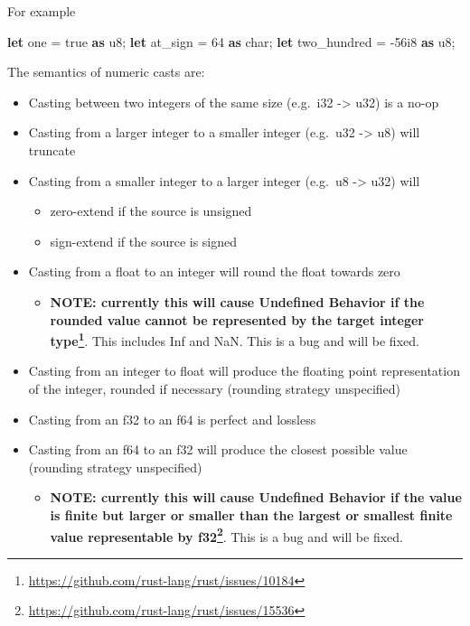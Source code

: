 \documentclass[a4paper,]{book}
\newenvironment{Shaded}{\begin{snugshade}}{\end{snugshade}}
\newcommand{\KeywordTok}[1]{\textcolor[rgb]{0.13,0.29,0.53}{\textbf{{#1}}}}
\newcommand{\DataTypeTok}[1]{\textcolor[rgb]{0.13,0.29,0.53}{{#1}}}
\newcommand{\DecValTok}[1]{\textcolor[rgb]{0.00,0.00,0.81}{{#1}}}
\newcommand{\ConstantTok}[1]{\textcolor[rgb]{0.00,0.00,0.00}{{#1}}}
\newcommand{\NormalTok}[1]{{#1}}
\renewcommand{\href}[2]{#2\footnote{\url{#1}}}
\providecommand{\tightlist}{%
  \setlength{\itemsep}{0pt}\setlength{\parskip}{0pt}}
\begin{document}
For example

\begin{Shaded}
\begin{Highlighting}[]
\KeywordTok{let} \NormalTok{one = }\ConstantTok{true} \KeywordTok{as} \DataTypeTok{u8}\NormalTok{;}
\KeywordTok{let} \NormalTok{at_sign = }\DecValTok{64} \KeywordTok{as} \DataTypeTok{char}\NormalTok{;}
\KeywordTok{let} \NormalTok{two_hundred = -}\DecValTok{56i8} \KeywordTok{as} \DataTypeTok{u8}\NormalTok{;}
\end{Highlighting}
\end{Shaded}

The semantics of numeric casts are:

\begin{itemize}
\tightlist
\item
  Casting between two integers of the same size (e.g.~i32
  -\textgreater{} u32) is a no-op
\item
  Casting from a larger integer to a smaller integer (e.g.~u32
  -\textgreater{} u8) will truncate
\item
  Casting from a smaller integer to a larger integer (e.g.~u8
  -\textgreater{} u32) will

  \begin{itemize}
  \tightlist
  \item
    zero-extend if the source is unsigned
  \item
    sign-extend if the source is signed
  \end{itemize}
\item
  Casting from a float to an integer will round the float towards zero

  \begin{itemize}
  \tightlist
  \item
    \textbf{\href{https://github.com/rust-lang/rust/issues/10184}{NOTE:
    currently this will cause Undefined Behavior if the rounded value
    cannot be represented by the target integer type}}. This includes
    Inf and NaN. This is a bug and will be fixed.
  \end{itemize}
\item
  Casting from an integer to float will produce the floating point
  representation of the integer, rounded if necessary (rounding strategy
  unspecified)
\item
  Casting from an f32 to an f64 is perfect and lossless
\item
  Casting from an f64 to an f32 will produce the closest possible value
  (rounding strategy unspecified)

  \begin{itemize}
  \tightlist
  \item
    \textbf{\href{https://github.com/rust-lang/rust/issues/15536}{NOTE:
    currently this will cause Undefined Behavior if the value is finite
    but larger or smaller than the largest or smallest finite value
    representable by f32}}. This is a bug and will be fixed.
  \end{itemize}
\end{itemize}
\end{document}
